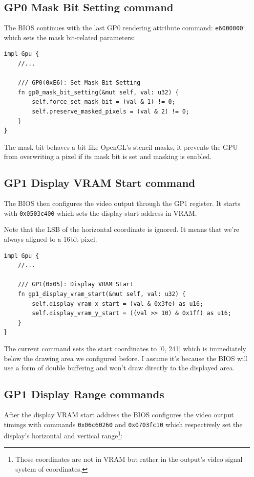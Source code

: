 \documentclass[a4paper]{article}
\newcommand{\code}[1] {\texttt{#1}}
\begin{document}
\subsection{GP0 Mask Bit Setting command}

The BIOS continues with the last GP0 rendering attribute command:
\code{e6000000}` which sets the mask bit-related parameters:

\begin{lstlisting}
impl Gpu {
    //...

    /// GP0(0xE6): Set Mask Bit Setting
    fn gp0_mask_bit_setting(&mut self, val: u32) {
        self.force_set_mask_bit = (val & 1) != 0;
        self.preserve_masked_pixels = (val & 2) != 0;
    }
}
\end{lstlisting}

The mask bit behaves a bit like OpenGL's stencil masks, it prevents
the GPU from overwriting a pixel if its mask bit is set and masking is
enabled.

\subsection{GP1 Display VRAM Start command}

The BIOS then configures the video output through the GP1 register. It
starts with \code{0x0503c400} which sets the display start address in
VRAM.

Note that the LSB of the horizontal coordinate is ignored. It means
that we're always aligned to a 16bit pixel.

\begin{lstlisting}
impl Gpu {
    //...

    /// GP1(0x05): Display VRAM Start
    fn gp1_display_vram_start(&mut self, val: u32) {
        self.display_vram_x_start = (val & 0x3fe) as u16;
        self.display_vram_y_start = ((val >> 10) & 0x1ff) as u16;
    }
}
\end{lstlisting}

The current command sets the start coordinates to [0, 241] which is
immediately below the drawing area we configured before. I assume it's
because the BIOS will use a form of double buffering and won't draw
directly to the displayed area.

\subsection{GP1 Display Range commands}

After the display VRAM start address the BIOS configures the video
output timings with commands \code{0x06c60260} and \code{0x0703fc10}
which respectively set the display's horizontal and vertical
range\footnote{Those coordinates are not in VRAM but rather in the
  output's video signal system of coordinates.}:
\end{document}
